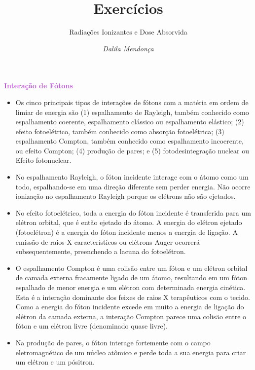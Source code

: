 \documentclass[11pt,a4paper]{article}
\title{\LobsterTwo\Huge{Exercícios}}
\author{\LobsterTwo\Large{Radiações Ionizantes e Dose Absorvida}\nocite{*}}
\date{\LobsterTwo\textit{Dalila Mendonça}}
\newcounter{exemplo}
\begin{document}
	\maketitle

\begin{exemplo}
    \textcolor{MediumOrchid}{\LobsterTwo\textbf{Interação de Fótons}}
    \begin{itemize}
        \item Os cinco principais tipos de interações de fótons com a matéria em ordem de limiar de energia são (1) espalhamento de Rayleigh, também conhecido como espalhamento coerente, espalhamento clássico ou espalhamento elástico; (2) efeito fotoelétrico, também conhecido como absorção fotoelétrica; (3) espalhamento Compton, também conhecido como espalhamento incoerente, ou efeito Compton; (4) produção de pares; e (5) fotodesintegração nuclear ou Efeito fotonuclear.
        
        \item No espalhamento Rayleigh, o fóton incidente interage com o átomo como um todo, espalhando-se em uma direção diferente sem perder energia. Não ocorre ionização no espalhamento Rayleigh porque os elétrons não são ejetados.
        
        \item No efeito fotoelétrico, toda a energia do fóton incidente é transferida para um elétron orbital, que é então ejetado do átomo. A energia do elétron ejetado (fotoelétron) é a energia do fóton incidente menos a energia de ligação. A emissão de raios-X característicos ou elétrons Auger ocorrerá subsequentemente, preenchendo a lacuna do fotoelétron.
        
        \item O espalhamento Compton é uma colisão entre um fóton e um elétron orbital de camada externa fracamente ligado de um átomo, resultando em um fóton espalhado de menor energia e um elétron com determinada energia cinética. Esta é a interação dominante dos feixes de raios X terapêuticos com o tecido. Como a energia do fóton incidente excede em muito a energia de ligação do elétron da camada externa, a interação Compton parece uma colisão entre o fóton e um elétron livre (denominado quase livre).
        
        \item Na produção de pares, o fóton interage fortemente com o campo eletromagnético de um núcleo atômico e perde toda a sua energia para criar um elétron e um pósitron.
        

\end{itemize}
\end{exemplo}
\end{document}
